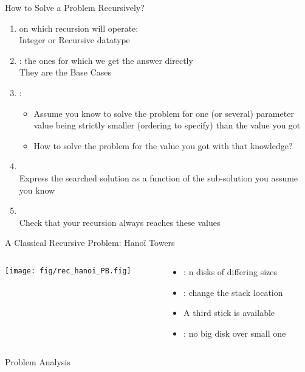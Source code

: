 \begin{Coupe}
\begin{frame}{How to Solve a Problem Recursively?}
  \begin{enumerate}
  \item {} on which recursion will operate: \\
    {\small Integer or Recursive datatype}
  \item {}: the ones for which we get the answer
    directly\\ 
    {\small They are the Base Cases}
  \item {}:
    \begin{itemize}
    \item {\small \alert{Assume you know to solve} the problem for one (or
        several) parameter \alert{value} being \alert{strictly smaller}
        (ordering to specify) than the value you got}
    \item How to solve the problem for the value you got with that knowledge?
    \end{itemize}
  \item {} \\
    {\small Express the searched solution as a function of the sub-solution you
      assume you know}
  \item {}\\
    {\small Check that your recursion always reaches these values} 
  \end{enumerate}
\end{frame}
\begin{frame}{A Classical Recursive Problem: Hanoï Towers}
  \begin{columns} 
    \begin{column}{.4\linewidth}
      \texttt{[image: fig/rec\_hanoi\_PB.fig]}   
    \end{column}
    \begin{column}{.6\linewidth}
      \begin{itemize}
      \item {}: n disks of differing sizes
      \item {}: change the stack location
      \item[] A third stick is available
      \item {}:  no big disk over small one
      \end{itemize}
    \end{column}
  \end{columns}
\end{frame}
\begin{frame}{Problem Analysis}


\end{frame}
\end{Coupe}
